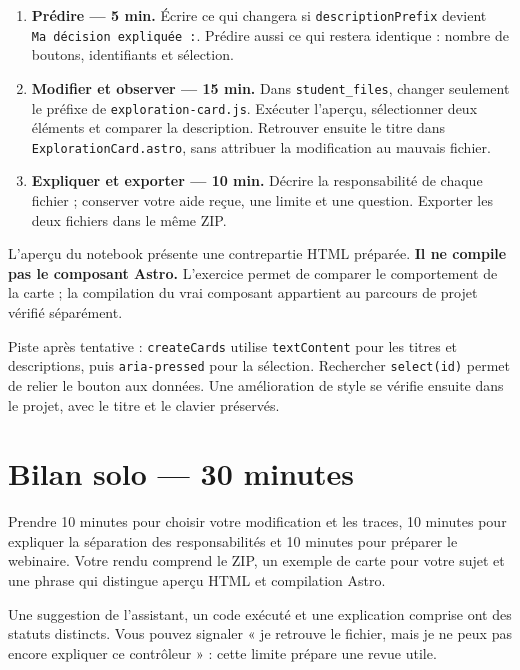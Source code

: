 \documentclass[
  canadien,
  11pt,
  a4paper,
]{report}
\providecommand{\tightlist}{%
  \setlength{\itemsep}{0pt}\setlength{\parskip}{0pt}}
\begin{document}
\begin{enumerate}
\def\labelenumi{\arabic{enumi}.}
\tightlist
\item
  \textbf{Prédire --- 5 min.} Écrire ce qui changera si
  \texttt{description\allowbreak{}Prefix} devient
  \texttt{Ma\ décision\ expliquée\ :}. Prédire aussi ce qui restera
  identique : nombre de boutons, identifiants et sélection.
\item
  \textbf{Modifier et observer --- 15 min.} Dans
  \texttt{student\_\allowbreak{}files}, changer seulement le préfixe de
  \texttt{exploration-card.js}. Exécuter l'aperçu, sélectionner deux
  éléments et comparer la description. Retrouver ensuite le titre dans
  \texttt{Exploration\allowbreak{}Card.astro}, sans attribuer la modification au
  mauvais fichier.
\item
  \textbf{Expliquer et exporter --- 10 min.} Décrire la responsabilité
  de chaque fichier ; conserver votre aide reçue, une limite et une
  question. Exporter les deux fichiers dans le même ZIP.
\end{enumerate}

L'aperçu du notebook présente une contrepartie HTML préparée. \textbf{Il
ne compile pas le composant Astro.} L'exercice permet de comparer le
comportement de la carte ; la compilation du vrai composant appartient
au parcours de projet vérifié séparément.

Piste après tentative : \texttt{create\allowbreak{}Cards} utilise
\texttt{text\allowbreak{}Content} pour les titres et descriptions, puis
\texttt{aria-pressed} pour la sélection. Rechercher \texttt{select(id)}
permet de relier le bouton aux données. Une amélioration de style se
vérifie ensuite dans le projet, avec le titre et le clavier préservés.

\section{Bilan solo --- 30 minutes}\label{bilan-solo-30-minutes-1}

Prendre 10 minutes pour choisir votre modification et les traces, 10
minutes pour expliquer la séparation des responsabilités et 10 minutes
pour préparer le webinaire. Votre rendu comprend le ZIP, un exemple de
carte pour votre sujet et une phrase qui distingue aperçu HTML et
compilation Astro.

Une suggestion de l'assistant, un code exécuté et une explication
comprise ont des statuts distincts. Vous pouvez signaler « je retrouve
le fichier, mais je ne peux pas encore expliquer ce contrôleur » : cette
limite prépare une revue utile.
\end{document}
